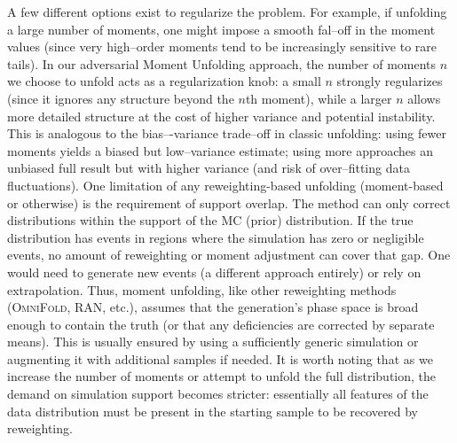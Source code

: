         A few different options exist to regularize the problem.
        For example, if unfolding a large number of moments, one might impose a smooth fal--off in the moment values (since very high--order moments tend to be increasingly sensitive to rare tails).
        In our adversarial Moment Unfolding approach, the number of moments $n$ we choose to unfold acts as a regularization knob: a small $n$ strongly regularizes (since it ignores any structure beyond the $n$th moment), while a larger $n$ allows more detailed structure at the cost of higher variance and potential instability.\kd{}
        This is analogous to the bias–-variance trade--off in classic unfolding: using fewer moments yields a biased but low--variance estimate; using more approaches an unbiased full result but with higher variance (and risk of over--fitting data fluctuations).
        One limitation of any reweighting-based unfolding (moment-based or otherwise) is the requirement of support overlap.
        The method can only correct distributions within the support of the MC (prior) distribution.
        If the true distribution has events in regions where the simulation has zero or negligible events, no amount of reweighting or moment adjustment can cover that gap.
        One would need to generate new events (a different approach entirely) or rely on extrapolation.
        Thus, moment unfolding, like other reweighting methods (\textsc{OmniFold}, RAN, etc.), assumes that the generation's phase space is broad enough to contain the truth (or that any deficiencies are corrected by separate means).
        This is usually ensured by using a sufficiently generic simulation or augmenting it with additional samples if needed.
        It is worth noting that as we increase the number of moments or attempt to unfold the full distribution, the demand on simulation support becomes stricter: essentially all features of the data distribution must be present in the starting sample to be recovered by reweighting.
